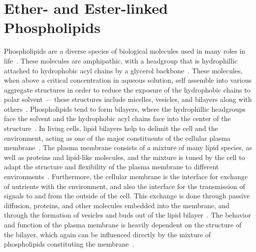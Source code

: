 \documentclass[12pt,openany,final]{book}
\begin{document}
\section{Ether- and Ester-linked Phospholipids}
Phospholipids are a diverse species of biological molecules used in many roles in life~\cite{van:2008:lipidvariety}. These molecules
are amphipathic, with a headgroup that is hydrophillic attached to hydrophobic acyl chains by a
glycerol backbone~\cite{pandit:2008:simulationtextbook,israelachvili:2011:intermol}. 
These molecules, when above a critical concentration in aqueous solution, self assemble into
various aggregate structures in order 
to reduce the exposure of the hydrophobic chains
to polar solvent --- these structures include
micelles, vesicles, and bilayers along with others~\cite{israelachvili:2011:intermol}. 
Phospholipids tend to form bilayers, 
where the hydrophillic headgroups face the solvent and the 
hydrophobic acyl chains face into the center 
of the structure~\cite{israelachvili:2011:intermol,ashrafuzzaman:2012:membrane}. 
In living cells, lipid bilayers help to delimit the cell and the environment, acting as one of the major constituents of the cellular 
plasma membrane~\cite{reece:2014:biobook}. The plasma membrane consists of a mixture of many lipid species, as
well as proteins and lipid-like molecules, and the mixture is tuned by the cell to adapt the 
structure and flexibility of the plasma membrane to different environments~\cite{pandit:2008:simulationtextbook,van:2008:lipidvariety,zhang:2008:memhomeo}. 
Furthermore, the cellular membrane is the interface for exchange
of nutrients with the environment, and also the interface for the transmission of signals to and from the outside of the cell. This
exchange is done through passive diffusion, proteins, and other molecules embedded into the membrane, and through the formation
of vesicles and buds out of the lipid bilayer~\cite{reece:2014:biobook}. The behavior and function of the plasma membrane
is heavily dependent on the structure of the bilayer, which again can be influenced directly by the mixture of phospholipids constituting the
membrane~\cite{van:2008:lipidvariety,zhang:2008:memhomeo}.
\end{document}
